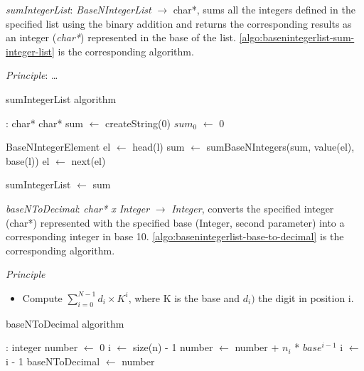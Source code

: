 \documentclass[book, nodocumentinfo]{upmethodology-document}
\begin{document}
\emph{sumIntegerList}: \emph{BaseNIntegerList} \(\rightarrow\) char*,
sums all the integers defined in the specified list using the binary addition and returns
the corresponding results as an integer (\emph{char*}) represented in the base of the list.
\ref{algo:basenintegerlist-sum-integer-list} is the corresponding algorithm.

\emph{Principle}: …

\begin{algorithm}[H]
    \label{algo:basenintegerlist-sum-integer-list}
    \caption{sumIntegerList algorithm}

    \begin{algorithmic}
         : char*
            \State char* sum \(\leftarrow\) createString(0)
            \State \(sum_0\) \(\leftarrow\) 0

            \State BaseNIntegerElement el \(\leftarrow\) head(l)
                \State sum \(\leftarrow\) sumBaseNIntegers(sum, value(el), base(l))
                \State el \(\leftarrow\) next(el)
            \EndWhile

            \State sumIntegerList \(\leftarrow\) sum
        \EndFunction
    \end{algorithmic}
\end{algorithm}


\emph{baseNToDecimal}: \emph{char* x Integer} \(\rightarrow\) \emph{Integer},
converts the specified integer (char*) represented with the specified base (Integer, second parameter) into a corresponding integer in base 10.
\ref{algo:basenintegerlist-base-to-decimal} is the corresponding algorithm.

\emph{Principle}
\begin{itemize}
    \item Compute \(\sum\limits_{i=0}^{N - 1}{d_i \times K^i}\), where K is the base and \(d_i)\) the digit in position i.
\end{itemize}

\begin{algorithm}[H]
    \label{algo:basenintegerlist-base-to-decimal}
    \caption{baseNToDecimal algorithm}

    \begin{algorithmic}
         : integer
            \State number \(\leftarrow\) 0
            \State i \(\leftarrow\) size(n) - 1
                \State number \(\leftarrow\) number + \(n_i\) * \(base^{i-1}\)
                \State i \(\leftarrow\) i - 1
            \EndWhile
            \State baseNToDecimal \(\leftarrow\) number
        \EndFunction
    \end{algorithmic}
\end{algorithm}
\end{document}

